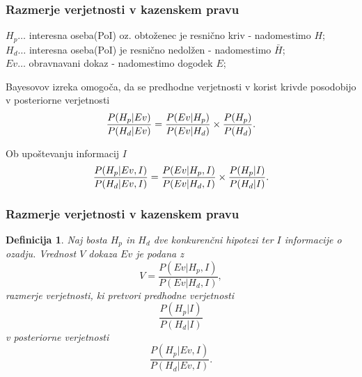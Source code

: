 \documentclass{beamer}
\newtheorem{definicija}{Definicija}
\begin{document}
\begin{frame}
    \frametitle{Razmerje verjetnosti v kazenskem pravu}
    $H_p \dots$ interesna oseba(PoI) oz. obtoženec je resnično kriv - nadomestimo $H$;\\
    $H_d \dots$ interesna oseba(PoI) je resnično nedolžen - nadomestimo $\bar{H}$;\\
    $Ev \dots$ obravnavani dokaz - nadomestimo dogodek $E$;\\
    \begin{block}{Bayesovov izreka omogoča, da se predhodne verjetnosti v korist krivde posodobijo v posteriorne verjetnosti}
        \[
            \frac{P(H_p \lvert Ev)}{P(H_d \lvert Ev)} = \frac{P(Ev \lvert H_p)}{P(Ev \lvert H_d)} \times \frac{P(H_p)}{P(H_d)}. \vspace{2mm}
        \]
    \end{block}\vspace{2mm}
    \begin{block}{Ob upoštevanju informacij $I$}
        \[
            \frac{P(H_p \lvert Ev, I)}{P(H_d \lvert Ev, I)} = \frac{P(Ev \lvert H_p, I)}{P(Ev \lvert H_d, I)} \times \frac{P(H_p \lvert I)}{P(H_d \lvert I)}. \vspace{2mm}
        \]
    \end{block}
\end{frame}

\begin{frame}
    \frametitle{Razmerje verjetnosti v kazenskem pravu}
    \begin{definicija}
        Naj bosta  $H_p$ in $H_d$ dve konkurenčni hipotezi ter $I$ informacije o ozadju. Vrednost $V$ dokaza $Ev$ je podana z
        \[
            V = \frac{P(Ev \lvert H_p, I)}{P(Ev \lvert H_d, I)},
        \]
        razmerje verjetnosti, ki pretvori predhodne verjetnosti
        \[
            \frac{P(H_p \lvert I)}{P(H_d \lvert I)} 
        \]
        v posteriorne verjetnosti
        \[
            \frac{P(H_p \lvert Ev, I)}{P(H_d \lvert Ev, I)}.
        \]
     \end{definicija}     
\end{frame}
\end{document}
